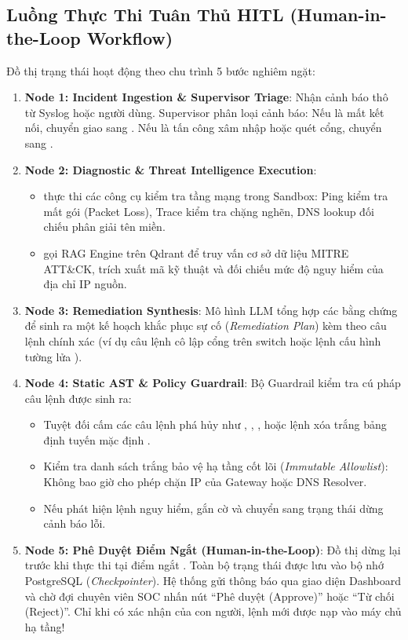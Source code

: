 \subsection{Luồng Thực Thi Tuân Thủ HITL (Human-in-the-Loop Workflow)}
Đồ thị trạng thái hoạt động theo chu trình 5 bước nghiêm ngặt:
\begin{enumerate}
  \item \textbf{Node 1: Incident Ingestion \& Supervisor Triage}:
  Nhận cảnh báo thô từ Syslog hoặc người dùng. Supervisor phân loại cảnh báo: Nếu là mất kết nối, chuyển giao sang . Nếu là tấn công xâm nhập hoặc quét cổng, chuyển sang .
  \item \textbf{Node 2: Diagnostic \& Threat Intelligence Execution}:
  \begin{itemize}
    \item {} thực thi các công cụ kiểm tra tầng mạng trong Sandbox: Ping kiểm tra mất gói (Packet Loss), Trace kiểm tra chặng nghẽn, DNS lookup đối chiếu phân giải tên miền.
    \item {} gọi RAG Engine trên Qdrant để truy vấn cơ sở dữ liệu MITRE ATT\&CK, trích xuất mã kỹ thuật và đối chiếu mức độ nguy hiểm của địa chỉ IP nguồn.
  \end{itemize}
  \item \textbf{Node 3: Remediation Synthesis}:
  Mô hình LLM tổng hợp các bằng chứng để sinh ra một kế hoạch khắc phục sự cố (\textit{Remediation Plan}) kèm theo câu lệnh chính xác (ví dụ câu lệnh cô lập cổng trên switch hoặc lệnh cấu hình tường lửa ).
  \item \textbf{Node 4: Static AST \& Policy Guardrail}:
  Bộ Guardrail kiểm tra cú pháp câu lệnh được sinh ra:
  \begin{itemize}
    \item Tuyệt đối cấm các câu lệnh phá hủy như , , , hoặc lệnh xóa trắng bảng định tuyến mặc định .
    \item Kiểm tra danh sách trắng bảo vệ hạ tầng cốt lõi (\textit{Immutable Allowlist}): Không bao giờ cho phép chặn IP của Gateway hoặc DNS Resolver.
    \item Nếu phát hiện lệnh nguy hiểm, gắn cờ  và chuyển sang trạng thái dừng cảnh báo lỗi.
  \end{itemize}
  \item \textbf{Node 5: Phê Duyệt Điểm Ngắt (Human-in-the-Loop)}:
  Đồ thị dừng lại trước khi thực thi tại điểm ngắt . Toàn bộ trạng thái được lưu vào bộ nhớ PostgreSQL (\textit{Checkpointer}).
  Hệ thống gửi thông báo qua giao diện Dashboard và chờ đợi chuyên viên SOC nhấn nút ``Phê duyệt (Approve)'' hoặc ``Từ chối (Reject)''. Chỉ khi có xác nhận của con người, lệnh mới được nạp vào máy chủ hạ tầng!
\end{enumerate}

